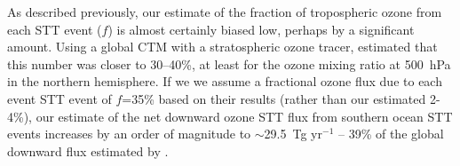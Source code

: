   As described previously, our estimate of the fraction of tropospheric ozone from each STT event ($f$) is almost certainly biased low, perhaps by a significant amount. 
  Using a global CTM with a stratospheric ozone tracer, \citet{Terao2008} estimated that this number was closer to 30--40\%, at least for the ozone mixing ratio at 500~hPa in the northern hemisphere.
  If we we assume a fractional ozone flux due to each event STT event of $f$=35\% based on their results (rather than our estimated 2-4\%), our estimate of the net downward ozone STT flux from southern ocean STT events increases by an order of magnitude to $\sim$29.5~Tg yr$^{-1}$ -- 39\% of the global downward flux estimated by \citet{Sprenger2003}.

  
